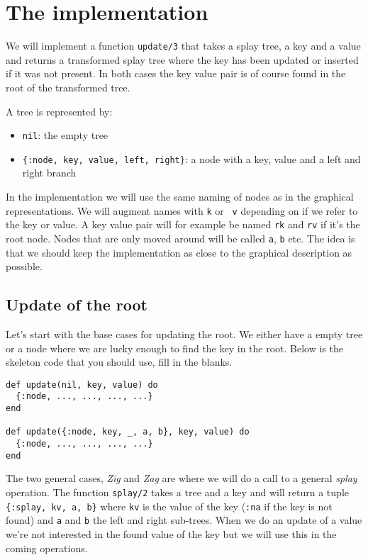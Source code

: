 \documentclass[a4paper,11pt]{article}
\begin{document}
\pagebreak



\section{The implementation}

We will implement a function {\tt update/3} that takes a splay tree, a
key and a value and returns a transformed splay tree where the key has
been updated or inserted if it was not present. In both cases the key
value pair is of course found in the root of the transformed tree.

A tree is represented by:
\begin{itemize}
  \item {\tt nil}:  the empty tree
  \item {\tt \{:node, key, value, left, right\}}:  a node with a key, value and a left and right branch
\end{itemize}

In the implementation we will use the same naming of nodes as in the
graphical representations. We will augment names with {\tt k} or {\tt
  v} depending on if we refer to the key or value. A key value pair
will for example be named {\tt rk} and {\tt rv} if it's the root
node. Nodes that are only moved around will be called {\tt a}, {\tt b}
etc.  The idea is that we should keep the implementation as close to
the graphical description as possible.

\subsection{Update of the root}
Let's start with the base cases for updating the root. We either have
a empty tree or a node where we are lucky enough to find the key in
the root. Below is the skeleton code that you should use, fill in the
blanks.

\begin{verbatim}
def update(nil, key, value) do
  {:node, ..., ..., ..., ...}
end

def update({:node, key, _, a, b}, key, value) do
  {:node, ..., ..., ..., ...}
end
\end{verbatim}

The two general cases, {\em Zig} and  {\em Zag} are where we will do a
call to  a general {\em  splay} operation. The function  {\tt splay/2}
takes a  tree and a key  and will return  a tuple {\tt \{:splay,  kv, a,
  b\}} where {\tt kv}  is the value of the key ({\tt :na}  if the key is
not found) and {\tt a} and {\tt  b} the left and right sub-trees. When
we do an update of a value  we're not interested in the found value of
the key but we will use this in the coming operations.
\end{document}
